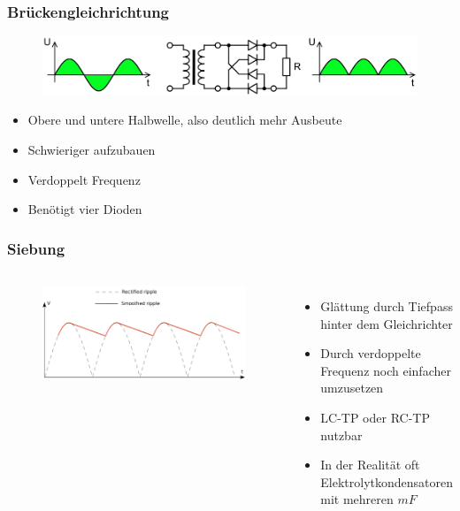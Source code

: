 \begin{frame}
  \frametitle{Brückengleichrichtung}
  \begin{center}
    \begin{figure}
      \includegraphics[width=1\textwidth,height=.6\textheight,keepaspectratio]{a05/Gratz_rectifier.png}
    \end{figure}
    \begin{itemize}
      \item Obere und untere Halbwelle, also deutlich mehr Ausbeute
      \item Schwieriger aufzubauen
      \item Verdoppelt Frequenz
      \item Benötigt vier Dioden
    \end{itemize}
  \end{center}
\end{frame}

\begin{frame}
  \frametitle{Siebung}
  \begin{columns}[c]
    \begin{center}
      \begin{figure}
        \includegraphics[width=1\textwidth,height=.75\textheight,keepaspectratio]{a05/Smoothed_ripple.png}
      \end{figure}
    \end{center}
    \begin{itemize}
      \item Glättung durch Tiefpass hinter dem Gleichrichter
      \item Durch verdoppelte Frequenz noch einfacher umzusetzen
      \item LC-TP oder RC-TP nutzbar
      \item In der Realität oft Elektrolytkondensatoren mit mehreren $mF$
    \end{itemize}
  \end{columns}
\end{frame}

